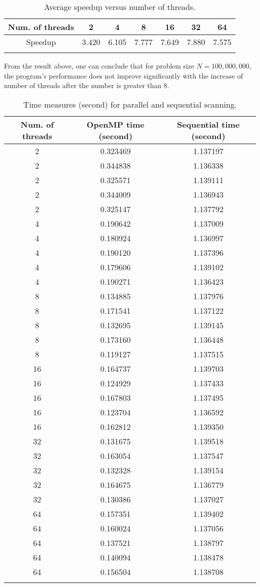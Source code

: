 \documentclass[amsmath,amssymb]{revtex4}
\begin{document}
\begin{longtable}{c | c | c | c | c | c | c }
    \hline 
Num. of threads& 2 & 4 & 8 & 16 & 32 & 64  \\ \hline \hline
Speedup		&3.420	&6.105 &	7.777 & 7.649 & 7.880 & 7.575\\\hline
\caption{Average speedup versus number of threads.}
\end{longtable}

From the result above, one can conclude that for problem size $N = 100,000,000$, the program's performance does not improve significantly with the increase of number of threads after the number is greater than 8.

\begin{longtable}{c| c | c }
    \hline 
     Num. of threads & OpenMP time (second) & Sequential time (second)   \\ \hline \hline
2	&0.323469	&1.137197	\\\hline
2	&0.344838	&1.136338	\\\hline
2	&0.325571	&1.139111	\\\hline
2	&0.344009	&1.136943	\\\hline
2	&0.325147	&1.137792	\\\hline

4	&0.190642	&1.137009	\\\hline
4	&0.180924	&1.136997	\\\hline
4	&0.190120	&1.137396	\\\hline
4	&0.179606	&1.139102	\\\hline
4	&0.190271	&1.136423	\\\hline

8	&0.134885	&1.137976	\\\hline
8	&0.171541	&1.137122	\\\hline
8	&0.132695	&1.139145	\\\hline
8	&0.173160	&1.136448	\\\hline
8	&0.119127	&1.137515	\\\hline

16	&0.164737	&1.139703	\\\hline
16	&0.124929	&1.137433	\\\hline
16	&0.167803	&1.137495	\\\hline
16	&0.123704	&1.136592	\\\hline
16	&0.162812	&1.139350	\\\hline

32	&0.131675	&1.139518	\\\hline
32	&0.163054	&1.137547	\\\hline
32	&0.132328	&1.139154	\\\hline
32	&0.164675	&1.136779	\\\hline
32	&0.130386	&1.137027	\\\hline

64	&0.157351	&1.139402	\\\hline
64	&0.160024	&1.137056	\\\hline
64	&0.137521	&1.138797	\\\hline
64	&0.140094	&1.138478	\\\hline
64	&0.156504	&1.138708	\\\hline
\caption{Time measures (second) for parallel and sequential scanning.}
\end{longtable}
\end{document}

